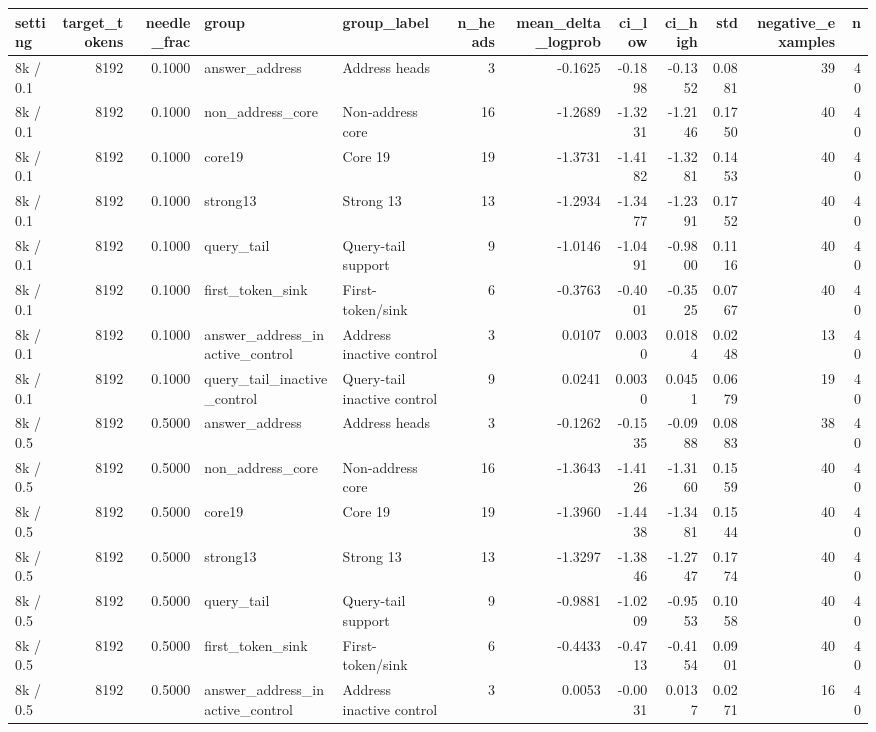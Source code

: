 \begin{tabular}{lrrllrrrrrrr}
\toprule
setting & target_tokens & needle_frac & group & group_label & n_heads & mean_delta_logprob & ci_low & ci_high & std & negative_examples & n \\
\midrule
8k / 0.1 & 8192 & 0.1000 & answer_address & Address heads & 3 & -0.1625 & -0.1898 & -0.1352 & 0.0881 & 39 & 40 \\
8k / 0.1 & 8192 & 0.1000 & non_address_core & Non-address core & 16 & -1.2689 & -1.3231 & -1.2146 & 0.1750 & 40 & 40 \\
8k / 0.1 & 8192 & 0.1000 & core19 & Core 19 & 19 & -1.3731 & -1.4182 & -1.3281 & 0.1453 & 40 & 40 \\
8k / 0.1 & 8192 & 0.1000 & strong13 & Strong 13 & 13 & -1.2934 & -1.3477 & -1.2391 & 0.1752 & 40 & 40 \\
8k / 0.1 & 8192 & 0.1000 & query_tail & Query-tail support & 9 & -1.0146 & -1.0491 & -0.9800 & 0.1116 & 40 & 40 \\
8k / 0.1 & 8192 & 0.1000 & first_token_sink & First-token/sink & 6 & -0.3763 & -0.4001 & -0.3525 & 0.0767 & 40 & 40 \\
8k / 0.1 & 8192 & 0.1000 & answer_address_inactive_control & Address inactive control & 3 & 0.0107 & 0.0030 & 0.0184 & 0.0248 & 13 & 40 \\
8k / 0.1 & 8192 & 0.1000 & query_tail_inactive_control & Query-tail inactive control & 9 & 0.0241 & 0.0030 & 0.0451 & 0.0679 & 19 & 40 \\
8k / 0.5 & 8192 & 0.5000 & answer_address & Address heads & 3 & -0.1262 & -0.1535 & -0.0988 & 0.0883 & 38 & 40 \\
8k / 0.5 & 8192 & 0.5000 & non_address_core & Non-address core & 16 & -1.3643 & -1.4126 & -1.3160 & 0.1559 & 40 & 40 \\
8k / 0.5 & 8192 & 0.5000 & core19 & Core 19 & 19 & -1.3960 & -1.4438 & -1.3481 & 0.1544 & 40 & 40 \\
8k / 0.5 & 8192 & 0.5000 & strong13 & Strong 13 & 13 & -1.3297 & -1.3846 & -1.2747 & 0.1774 & 40 & 40 \\
8k / 0.5 & 8192 & 0.5000 & query_tail & Query-tail support & 9 & -0.9881 & -1.0209 & -0.9553 & 0.1058 & 40 & 40 \\
8k / 0.5 & 8192 & 0.5000 & first_token_sink & First-token/sink & 6 & -0.4433 & -0.4713 & -0.4154 & 0.0901 & 40 & 40 \\
8k / 0.5 & 8192 & 0.5000 & answer_address_inactive_control & Address inactive control & 3 & 0.0053 & -0.0031 & 0.0137 & 0.0271 & 16 & 40 \\

\end{tabular}
